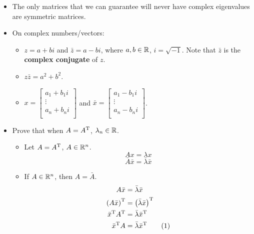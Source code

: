 \documentclass{article}
\begin{document}
\begin{itemize}
\begin{itemize}
    \end{itemize}
    \item The only matrices that we can guarantee will never have complex eigenvalues are symmetric matrices.
    \item On complex numbers/vectors:
    \begin{itemize}
        \item $z=a+bi$ and $\bar{z}=a-bi$, where $a,b\in\mathbb{R}$, $i=\sqrt{-1}$. Note that $\bar{z}$ is the \textbf{complex conjugate} of $z$.
        \item $z\bar{z} = a^2+b^2$.
        \item $
            x =
            \begin{bmatrix}
                a_1+b_1i\\
                \vdots\\
                a_n+b_ni\\
            \end{bmatrix}
        $ and $
            \bar{x} =
            \begin{bmatrix}
                a_1-b_1i\\
                \vdots\\
                a_n-b_ni\\
            \end{bmatrix}
        $.
    \end{itemize}
    \item Prove that when $A = A^{\text{T}}$, $\lambda_n\in\mathbb{R}$.
    \begin{itemize}
        \item Let $A = A^{\text{T}}$, $A\in\mathbb{R}^n$.
        \begin{equation}\label{eqn:ortho3}
            Ax = \lambda x
        \end{equation}
        \begin{equation*}
            \bar{A}\bar{x} = \bar{\lambda}\bar{x}
        \end{equation*}
        \item If $A\in\mathbb{R}^n$, then $A=\bar{A}$.
        \begin{align*}
            A\bar{x} &= \bar{\lambda}\bar{x}\\
            \left( A\bar{x} \right)^\T &= \left( \bar{\lambda}\bar{x} \right)^\T\\
            \bar{x}^\T A^\T &= \bar{\lambda}\bar{x}^\T\\
            \bar{x}^\T A &= \bar{\lambda}\bar{x}^\T\stepcounter{equation}\tag{\theequation}\label{eqn:ortho4}\\

\end{align*}
\end{itemize}
\end{itemize}
\end{document}
